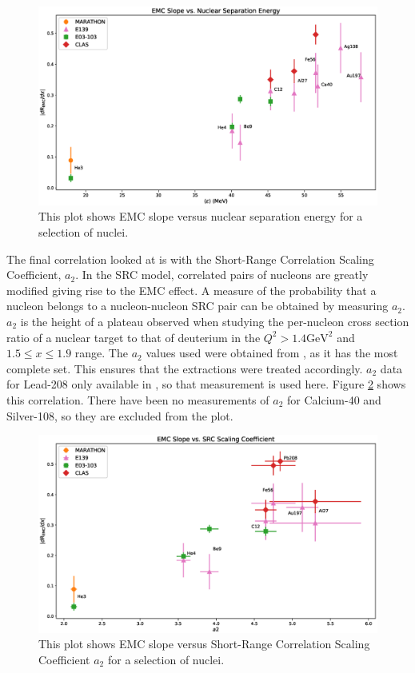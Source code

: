 \begin{figure}[p]
	\includegraphics[width=\textwidth]{./results/fig/EMC_vs_NSep.eps}
	\caption{This plot shows EMC slope versus nuclear separation energy for a selection of nuclei.}
	\label{fig:emc_v_nsep}
\end{figure}

The final correlation looked at is with the Short-Range Correlation Scaling Coefficient, $a_2$. In the SRC model, correlated pairs of nucleons are greatly modified giving rise to the EMC effect. A measure of the probability that a nucleon belongs to a nucleon-nucleon SRC pair can be obtained by measuring $a_2$. $a_2$ is the height of a plateau observed when studying the per-nucleon cross section ratio of a nuclear target to that of deuterium in the $Q^2 > 1.4 \text{GeV}^2$ and $1.5 \leq x \leq 1.9$ range. The $a_2$ values used were obtained from \cite{arrington_src}, as it has the most complete set. This ensures that the extractions were treated accordingly. $a_2$ data for Lead-208 only available in \cite{clas_emc}, so that measurement is used here. Figure \ref{fig:emc_v_a2} shows this correlation. There have been no measurements of $a_2$ for Calcium-40 and Silver-108, so they are excluded from the plot.

\begin{figure}[p]
	\includegraphics[width=\textwidth]{./results/fig/EMC_vs_a2.eps}
	\caption{This plot shows EMC slope versus Short-Range Correlation Scaling Coefficient $a_2$ for a selection of nuclei.}
	\label{fig:emc_v_a2}
\end{figure}